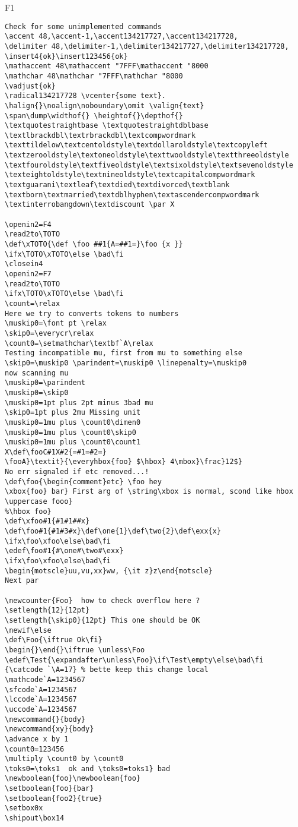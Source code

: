 \documentclass{article}
\begin{document}
\begin{filecontents+}{F1}
\begin{Verbatim}
Check for some unimplemented commands
\accent 48,\accent-1,\accent134217727,\accent134217728, 
\delimiter 48,\delimiter-1,\delimiter134217727,\delimiter134217728, 
\insert4{ok}\insert123456{ok}
\mathaccent 48\mathaccent "7FFF\mathaccent "8000
\mathchar 48\mathchar "7FFF\mathchar "8000
\vadjust{ok}
\radical134217728 \vcenter{some text}.
\halign{}\noalign\noboundary\omit \valign{text}
\span\dump\widthof{} \heightof{}\depthof{}
\textquotestraightbase \textquotestraightdblbase
\textlbrackdbl\textrbrackdbl\textcompwordmark
\texttildelow\textcentoldstyle\textdollaroldstyle\textcopyleft
\textzerooldstyle\textoneoldstyle\texttwooldstyle\textthreeoldstyle
\textfouroldstyle\textfiveoldstyle\textsixoldstyle\textsevenoldstyle
\texteightoldstyle\textnineoldstyle\textcapitalcompwordmark
\textguarani\textleaf\textdied\textdivorced\textblank
\textborn\textmarried\textdblhyphen\textascendercompwordmark
\textinterrobangdown\textdiscount \par X
 
\openin2=F4
\read2to\TOTO
\def\xTOTO{\def \foo ##1{A=##1=}\foo {x }}
\ifx\TOTO\xTOTO\else \bad\fi
\closein4
\openin2=F7
\read2to\TOTO
\ifx\TOTO\xTOTO\else \bad\fi
\count=\relax
Here we try to converts tokens to numbers
\muskip0=\font pt \relax
\skip0=\everycr\relax 
\count0=\setmathchar\textbf`A\relax
Testing incompatible mu, first from mu to something else
\skip0=\muskip0 \parindent=\muskip0 \linepenalty=\muskip0
now scanning mu
\muskip0=\parindent 
\muskip0=\skip0 
\muskip0=1pt plus 2pt minus 3bad mu
\skip0=1pt plus 2mu Missing unit
\muskip0=1mu plus \count0\dimen0
\muskip0=1mu plus \count0\skip0
\muskip0=1mu plus \count0\count1
X\def\fooC#1X#2{=#1=#2=}
\fooA}\textit}{\everyhbox{foo} $\hbox} 4\mbox}\frac}12$}
No err signaled if etc removed...!
\def\foo{\begin{comment}etc} \foo hey
\xbox{foo} bar} First arg of \string\xbox is normal, scond like hbox 
\uppercase fooo}
%\hbox foo}
\def\xfoo#1{#1#1##x}
\def\foo#1{#1#3#x}\def\one{1}\def\two{2}\def\exx{x}
\ifx\foo\xfoo\else\bad\fi
\edef\foo#1{#\one#\two#\exx}
\ifx\foo\xfoo\else\bad\fi
\begin{motscle}uu,vu,xx}ww, {\it z}z\end{motscle}
Next par

\newcounter{Foo}  how to check overflow here ?
\setlength{12}{12pt}
\setlength{\skip0}{12pt} This one should be OK
\newif\else
\def\Foo{\iftrue Ok\fi}
\begin{}\end{}\iftrue \unless\Foo
\edef\Test{\expandafter\unless\Foo}\if\Test\empty\else\bad\fi
{\catcode `\A=17} % bette keep this change local
\mathcode`A=1234567
\sfcode`A=1234567
\lccode`A=1234567
\uccode`A=1234567
\newcommand{}{body}
\newcommand{xy}{body}
\advance x by 1
\count0=123456
\multiply \count0 by \count0
\toks0=\toks1  ok and \toks0=toks1} bad
\newboolean{foo}\newboolean{foo}
\setboolean{foo}{bar}
\setboolean{foo2}{true}
\setbox0x
\shipout\box14


\end{Verbatim}
\end{filecontents+}
\end{document}

